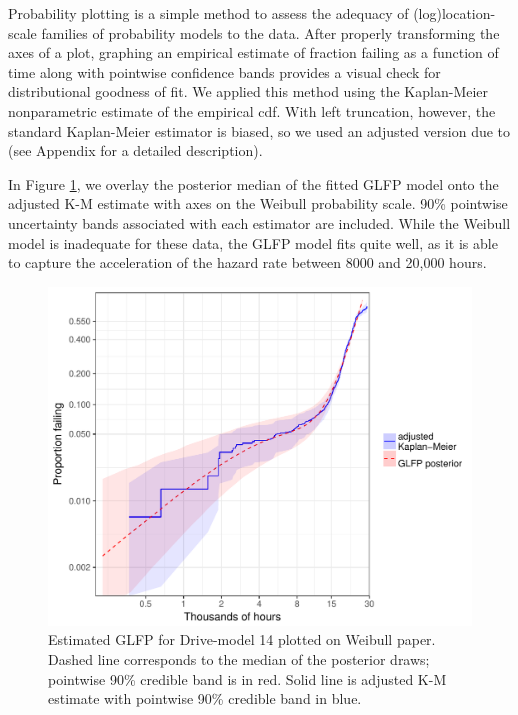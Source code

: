 \documentclass[12pt]{article}
\begin{document}
Probability plotting is a simple method to assess the adequacy of (log)location-scale families of probability models to the data.  After properly transforming the axes of a plot, graphing an empirical estimate of fraction failing as a function of time along with pointwise confidence bands provides a visual check for distributional goodness of fit.  We applied this method using the Kaplan-Meier nonparametric estimate of the empirical cdf.  With left truncation, however, the standard Kaplan-Meier estimator is biased, so we used an adjusted version due to \citet[Chapter 11]{meeker} (see Appendix for a detailed description).   


In Figure \ref{ex1-overlay}, we overlay the posterior median of the fitted GLFP model onto the adjusted K-M estimate with axes on the Weibull probability scale.  90\% pointwise uncertainty bands associated with each estimator are included. While the Weibull model is inadequate for these data, the GLFP model fits quite well, as it is able to capture the acceleration of the hazard rate between 8000 and 20,000 hours. %

\begin{figure}[H]
\centering
  \includegraphics[width=.8\textwidth]{km14-prob-plus}
  \caption{Estimated GLFP for Drive-model 14 plotted on Weibull paper.  Dashed line corresponds to the median of the posterior draws; pointwise 90\% credible band is in red.  Solid line is adjusted K-M estimate with pointwise 90\% credible band in blue.}
  \label{ex1-overlay}
\end{figure}
\end{document}
